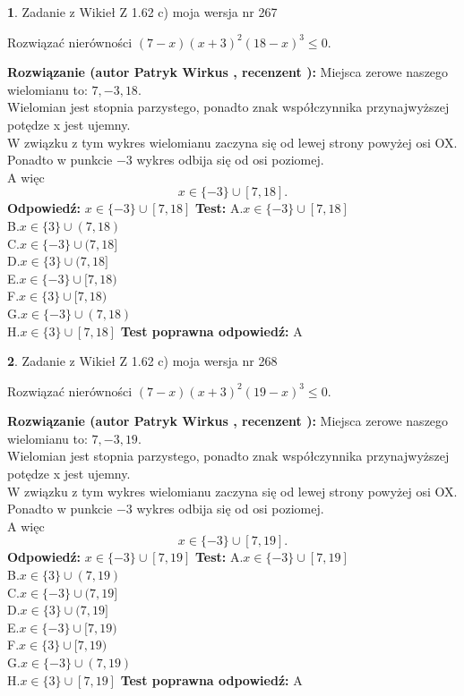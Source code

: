 \documentclass[12pt, a4paper]{article}
\theoremstyle{definition} %
\newtheorem{zad}{}
\newcommand{\zadStart}[1]{\begin{zad}#1\newline}
\newcommand{\zadStop}{\end{zad}}
\newcommand{\rozwStart}[2]{\noindent \textbf{Rozwiązanie (autor #1 , recenzent #2): }\newline}
\newcommand{\rozwStop}{\newline}
\newcommand{\odpStart}{\noindent \textbf{Odpowiedź:}\newline}
\newcommand{\odpStop}{\newline}
\newcommand{\testStart}{\noindent \textbf{Test:}\newline}
\newcommand{\testStop}{\newline}
\newcommand{\kluczStart}{\noindent \textbf{Test poprawna odpowiedź:}\newline}
\newcommand{\kluczStop}{\newline}
\begin{document}
\zadStart{Zadanie z Wikieł Z 1.62 c) moja wersja nr 267}

Rozwiązać nierówności $(7-x)(x+3)^{2}(18-x)^{3}\le0$.
\zadStop
\rozwStart{Patryk Wirkus}{}
Miejsca zerowe naszego wielomianu to: $7, -3, 18$.\\
Wielomian jest stopnia parzystego, ponadto znak współczynnika przy\linebreak najwyższej potędze x jest ujemny.\\ W związku z tym wykres wielomianu zaczyna się od lewej strony powyżej osi OX.\\
Ponadto w punkcie $-3$ wykres odbija się od osi poziomej.\\
A więc $$x \in \{-3\} \cup [7,18].$$
\rozwStop
\odpStart
$x \in \{-3\} \cup [7,18]$
\odpStop
\testStart
A.$x \in \{-3\} \cup [7,18]$\\
B.$x \in \{3\} \cup (7,18)$\\
C.$x \in \{-3\} \cup (7,18]$\\
D.$x \in \{3\} \cup (7,18]$\\
E.$x \in \{-3\} \cup [7,18)$\\
F.$x \in \{3\} \cup [7,18)$\\
G.$x \in \{-3\} \cup (7,18)$\\
H.$x \in \{3\} \cup [7,18]$
\testStop
\kluczStart
A
\kluczStop



\zadStart{Zadanie z Wikieł Z 1.62 c) moja wersja nr 268}

Rozwiązać nierówności $(7-x)(x+3)^{2}(19-x)^{3}\le0$.
\zadStop
\rozwStart{Patryk Wirkus}{}
Miejsca zerowe naszego wielomianu to: $7, -3, 19$.\\
Wielomian jest stopnia parzystego, ponadto znak współczynnika przy\linebreak najwyższej potędze x jest ujemny.\\ W związku z tym wykres wielomianu zaczyna się od lewej strony powyżej osi OX.\\
Ponadto w punkcie $-3$ wykres odbija się od osi poziomej.\\
A więc $$x \in \{-3\} \cup [7,19].$$
\rozwStop
\odpStart
$x \in \{-3\} \cup [7,19]$
\odpStop
\testStart
A.$x \in \{-3\} \cup [7,19]$\\
B.$x \in \{3\} \cup (7,19)$\\
C.$x \in \{-3\} \cup (7,19]$\\
D.$x \in \{3\} \cup (7,19]$\\
E.$x \in \{-3\} \cup [7,19)$\\
F.$x \in \{3\} \cup [7,19)$\\
G.$x \in \{-3\} \cup (7,19)$\\
H.$x \in \{3\} \cup [7,19]$
\testStop
\kluczStart
A
\kluczStop
\end{document}
